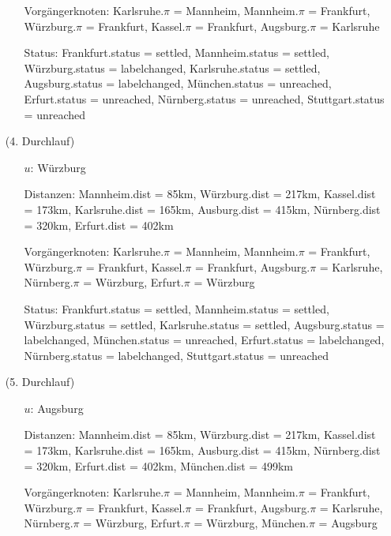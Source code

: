 \documentclass{article}
\begin{document}
\begin{itemize}
\begin{itemize}
\item[Vorgängerknoten:] Karlsruhe.$\pi$ = Mannheim,  Mannheim.$\pi$ = Frankfurt, Würzburg.$\pi$ = Frankfurt, Kassel.$\pi$ = Frankfurt, Augsburg.$\pi$ = Karlsruhe \\
\item[Status:] Frankfurt.status = settled, Mannheim.status = settled, Würzburg.status = labelchanged, Karlsruhe.status = settled, Augsburg.status = labelchanged, München.status = unreached, Erfurt.status = unreached, Nürnberg.status = unreached, Stuttgart.status = unreached \\
\end{itemize}
\item[(4. Durchlauf)]
\begin{itemize}
\item[$u$:] Würzburg \\
\item[Distanzen:] Mannheim.dist = 85km, Würzburg.dist = 217km, Kassel.dist = 173km, Karlsruhe.dist = 165km, Ausburg.dist = 415km, Nürnberg.dist = 320km, Erfurt.dist = 402km \\
\item[Vorgängerknoten:] Karlsruhe.$\pi$ = Mannheim,  Mannheim.$\pi$ = Frankfurt, Würzburg.$\pi$ = Frankfurt, Kassel.$\pi$ = Frankfurt, Augsburg.$\pi$ = Karlsruhe, Nürnberg.$\pi$ = Würzburg, Erfurt.$\pi$ = Würzburg \\
\item[Status:] Frankfurt.status = settled, Mannheim.status = settled, Würzburg.status = settled, Karlsruhe.status = settled, Augsburg.status = labelchanged, München.status = unreached, Erfurt.status = labelchanged, Nürnberg.status = labelchanged, Stuttgart.status = unreached \\
\end{itemize}
\item[(5. Durchlauf)]
\begin{itemize}
\item[$u$:] Augsburg \\
\item[Distanzen:] Mannheim.dist = 85km, Würzburg.dist = 217km, Kassel.dist = 173km, Karlsruhe.dist = 165km, Ausburg.dist = 415km, Nürnberg.dist = 320km, Erfurt.dist = 402km, München.dist = 499km \\
\item[Vorgängerknoten:] Karlsruhe.$\pi$ = Mannheim,  Mannheim.$\pi$ = Frankfurt, Würzburg.$\pi$ = Frankfurt, Kassel.$\pi$ = Frankfurt, Augsburg.$\pi$ = Karlsruhe, Nürnberg.$\pi$ = Würzburg, Erfurt.$\pi$ = Würzburg, München.$\pi$ = Augsburg \\

\end{itemize}
\end{itemize}
\end{document}
